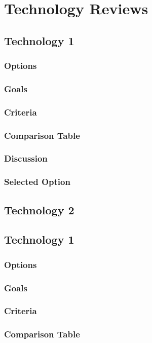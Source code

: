 \documentclass[10pt,draftclsnofoot,onecolumn]{IEEEtran}
\begin{document}
\section{Technology Reviews}
\subsection{Technology 1}
\subsubsection{Options}
\subsubsection{Goals}
\subsubsection{Criteria}
\subsubsection{Comparison Table}
\subsubsection{Discussion}
\subsubsection{Selected Option}
\subsection{Technology 2}
\subsection{Technology 1}
\subsubsection{Options}
\subsubsection{Goals}
\subsubsection{Criteria}
\subsubsection{Comparison Table}
\end{document}
